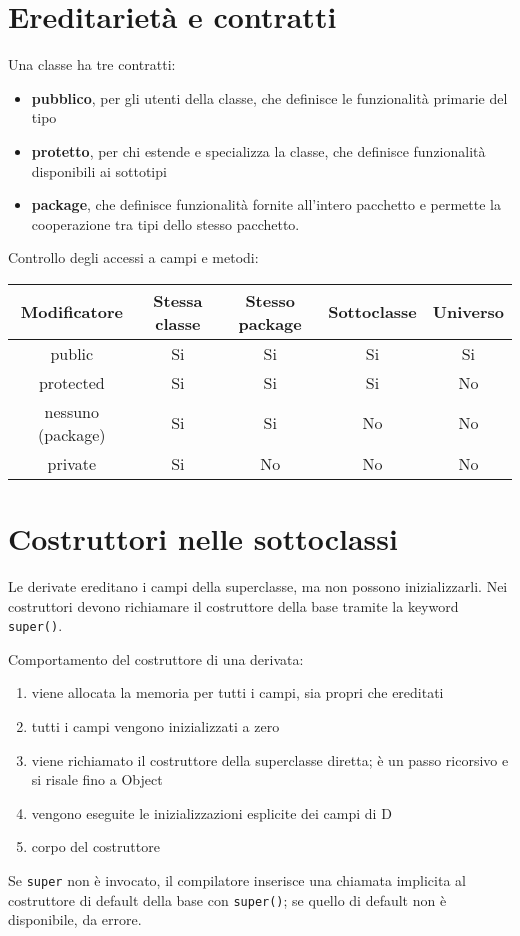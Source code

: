 \section{Ereditarietà e contratti} %
Una classe ha tre contratti:
\begin{itemize}
\item \textbf{pubblico}, per gli utenti della classe, che definisce le funzionalità primarie del tipo
\item \textbf{protetto}, per chi estende e specializza la classe, che definisce funzionalità disponibili ai sottotipi
\item \textbf{package}, che definisce funzionalità fornite all'intero pacchetto e permette la cooperazione tra tipi dello stesso pacchetto.
\end{itemize}
Controllo degli accessi a campi e metodi:
\begin{table}[h]
\begin{tabular}{|c|c|c|c|c|}
\hline
\textbf{Modificatore} & \textbf{Stessa classe} & \textbf{Stesso package} & \textbf{Sottoclasse} & \textbf{Universo} \\
\hline
public & Si & Si & Si & Si \\
\hline
protected & Si & Si & Si & No \\
\hline
nessuno (package) & Si & Si & No & No \\
\hline
private & Si & No & No & No \\
\hline
\end{tabular}
\end{table}

\section{Costruttori nelle sottoclassi} %
Le derivate ereditano i campi della superclasse, ma non possono inizializzarli. Nei costruttori devono richiamare il costruttore della base tramite la keyword \texttt{super()}.

Comportamento del costruttore di una derivata:
\begin{enumerate}
\item viene allocata la memoria per tutti i campi, sia propri che ereditati
\item tutti i campi vengono inizializzati a zero
\item viene richiamato il costruttore della superclasse diretta; è un passo ricorsivo e si risale fino a Object
\item vengono eseguite le inizializzazioni esplicite dei campi di D
\item corpo del costruttore
\end{enumerate}
Se \texttt{super} non è invocato, il compilatore inserisce una chiamata implicita al costruttore di default della base con \texttt{super()}; se quello di default non è disponibile, da errore.


